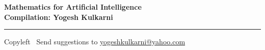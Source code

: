
\graphicspath{{images/}}
% 
% 
% 
% 

% 
%


\footnotesize


\begin{center}
\Large{\textbf{Mathematics for Artificial Intelligence\\ Compilation: Yogesh Kulkarni}}  
\end{center}

\begin{multicols}{2}

\end{multicols}

\rule{\linewidth}{0.25pt}
\scriptsize
Copyleft \textcopyleft\  Send suggestions to 
\href{http://www.yogeshkulkarni.com}{yogeshkulkarni@yahoo.com}


